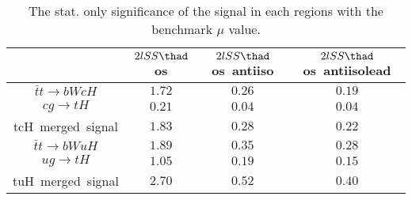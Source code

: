 \begin{table}
\footnotesize
\caption{The stat. only significance of the signal in each regions with the benchmark $\mu$ value.}
\centering
\begin{tabular}{|c|c|c|c|} \hline
 & $2lSS\thad$ os & $2lSS\thad$ os~antiiso & $2lSS\thad$ os~antiisolead\\\hline
$\bar{t}t\to bWcH$ & $1.72$ & $0.26$ & $0.19$\\\hline
$cg\to tH$ & $0.21$ & $0.04$ & $0.04$\\\hline
tcH~merged~signal & $1.83$ & $0.28$ & $0.22$\\\hline
$\bar{t}t\to bWuH$ & $1.89$ & $0.35$ & $0.28$\\\hline
$ug\to tH$ & $1.05$ & $0.19$ & $0.15$\\\hline
tuH~merged~signal & $2.70$ & $0.52$ & $0.40$\\\hline
\end{tabular}
\label{tab:significance}
\end{table}
